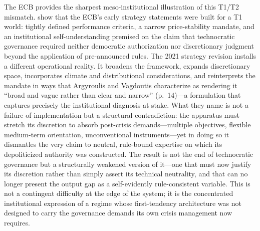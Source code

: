 \documentclass[11pt,a4paper]{article}
\begin{document}
The ECB provides the sharpest meso-institutional illustration of this T1/T2
mismatch. \citet{ArgyroulisVagdoutis2025} show that the ECB's early strategy
statements were built for a T1 world: tightly defined performance criteria, a
narrow price-stability mandate, and an institutional self-understanding premised
on the claim that technocratic governance required neither democratic
authorization nor discretionary judgment beyond the application of pre-announced
rules. The 2021 strategy revision installs a different operational reality. It
broadens the framework, expands discretionary space, incorporates climate and
distributional considerations, and reinterprets the mandate in ways that
Argyroulis and Vagdoutis characterize as rendering it ``broad and vague rather
than clear and narrow'' (p.~14)---a formulation that captures precisely the
institutional diagnosis at stake. What they name is not a failure of
implementation but a structural contradiction: the apparatus must stretch its
discretion to absorb post-crisis demands---multiple objectives, flexible
medium-term orientation, unconventional instruments---yet in doing so it
dismantles the very claim to neutral, rule-bound expertise on which its
depoliticized authority was constructed. The result is not the end of technocratic
governance but a structurally weakened version of it---one that must now justify
its discretion rather than simply assert its technical neutrality, and that can no
longer present the output gap as a self-evidently rule-consistent variable. This
is not a contingent difficulty at the edge of the system; it is the concentrated
institutional expression of a regime whose first-tendency architecture was not
designed to carry the governance demands its own crisis management now requires.


\end{document}
